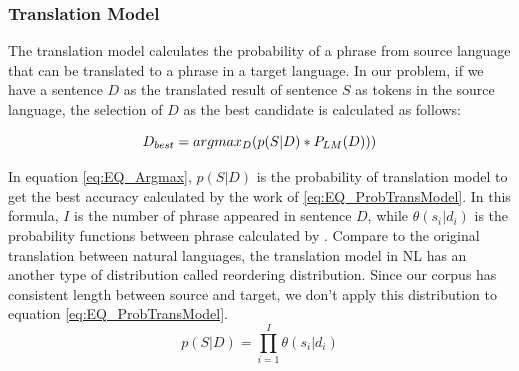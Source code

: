 \subsubsection{Translation Model}
The translation model calculates the probability of a phrase from source language that can be translated to a phrase in a target language. In our problem, if we have a sentence   \({D}\) as the translated result of sentence \({S}\) as tokens in the source language, the selection of \({D}\) as the best candidate is calculated as follows:

\begin{equation} 
\small
\label{eq:EQ_Argmax}
 D_{best}=argmax_{D}(p(S|D)*P_{LM}(D)))
\end{equation}

In equation \ref{eq:EQ_Argmax}, \({p(S|D)}\) is the probability of translation model to get the best accuracy calculated by the work of \ref{eq:EQ_ProbTransModel}. In this formula, \(I\) is the number of phrase appeared in sentence \({D}\), while \(\theta ({s_{i}}|{d_{i}})\) is the probability functions between phrase calculated by \cite{Green2014}. Compare to the original translation between natural languages, the translation model in NL has an another type of distribution called reordering distribution. Since our corpus has consistent length between source and target, we don't apply this distribution to equation \ref{eq:EQ_ProbTransModel}.
\begin{equation} 
\label{eq:EQ_ProbTransModel}
{p(S|D)=\prod_{i=1}^{I} \theta ({s_{i}}|{d_{i}}) }
\end{equation}


